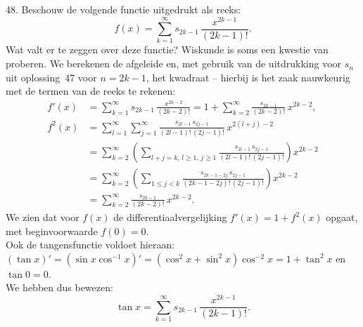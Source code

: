 \begin{problem}{48.}
    Beschouw de volgende functie uitgedrukt als reeks:
    \begin{equation*}
		f(x) = \textstyle\sum\limits_{k=1}^{\infty} s_{2k - 1}\, \frac{x^{2k - 1}}{(2k - 1)!}.
	\end{equation*}
    Wat valt er te zeggen over deze functie? Wiskunde is soms een kwestie van proberen. We berekenen de afgeleide en, met gebruik van de uitdrukking voor $s_n$ uit oplossing~47 voor $n = 2k - 1$, het kwadraat -- hierbij is het zaak nauwkeurig met de termen van de reeks te rekenen:
    \begin{equation*}
    \begin{split}
        f'(x)  & = \textstyle\sum\limits_{k=1}^{\infty} s_{2k - 1}\, \frac{x^{2k - 2}}{(2k - 2)!} = 1 + \textstyle\sum\limits_{k=2}^{\infty} \frac{s_{2k - 1}}{(2k - 2)!} \, x^{2k - 2}, \\
        f^2(x) & = \textstyle\sum\limits_{l=1}^{\infty} \textstyle\sum\limits_{j=1}^{\infty} \frac{s_{2l - 1}\, s_{2j - 1}}{(2l - 1)!\, (2j - 1)!} \, x^{2(l+j) - 2} \\
               & = \textstyle\sum\limits_{k=2}^{\infty} \left( \textstyle\sum\limits_{l+j=k,\, l \geq 1,\, j\geq 1} \frac{s_{2l - 1}\, s_{2j - 1}}{(2l - 1)!\, (2j - 1)!} \right) x^{2k - 2} \\
               & = \textstyle\sum\limits_{k=2}^{\infty} \left( \textstyle\sum\limits_{1 \leq j < k} \frac{s_{2k - 1 - 2j}\, s_{2j - 1}}{(2k - 1 - 2j)!\, (2j - 1)!} \right) x^{2k - 2} \\
               & = \textstyle\sum\limits_{k=2}^{\infty} \frac{s_{2k - 1}}{(2k - 2)!} \, x^{2k - 2}.
    \end{split}
    \end{equation*}
    We zien dat voor $f(x)$ de differentiaalvergelijking $f'(x) = 1 + f^2(x)$ opgaat, met beginvoorwaarde $f(0) = 0$.\\
    Ook de tangensfunctie voldoet hieraan: $(\tan x)' = (\sin x \cos^{-1} x)' = (\cos^2 x + \sin^2 x) \cos^{-2} x = 1 + \tan^2 x$ en $\tan 0 = 0$.\\
    We hebben dus bewezen:
    \begin{equation*}
		\tan x = \textstyle\sum\limits_{k=1}^{\infty} s_{2k - 1}\, \frac{x^{2k - 1}}{(2k - 1)!}.
	\end{equation*}
\end{problem}

\clearpage

